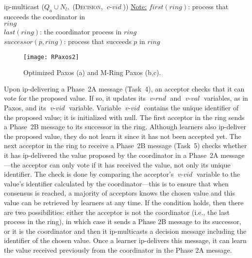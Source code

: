 \documentclass[final,3p,times,twocolumn,authoryear]{elsarticle}
\newcommand{\mv}[1]{\ensuremath{\operatorname{\mathit{#1}}}}
\begin{document}
\begin{algorithm}
\begin{distribalgo}[1]
		\ENDINDENT
			\STATE ip-multicast ($Q_a \cup N_l,$ (\textsc{Decision}, \mv{c-vid}))
		\ENDINDENT
	\ENDINDENT
\ENDINDENT
\vspace{5mm}
\underline{Note:} \hspace{2mm}$first(ring)$: process that succeeds the coordinator in\\
\hspace{9mm} $ring$\\
\hspace{10mm}$last(ring)$: the coordinator process in $ring$\\
\hspace{10mm}$successor(p, ring)$: process that succeeds $p$ in $ring$
\label{alg:rpaxos}
\end{distribalgo}


\end{algorithm}
 
\begin{figure*}[hbt]
\texttt{[image: RPaxos2]}
	\vspace{-5mm}\caption{Optimized Paxos (a) and M-Ring Paxos (b,c).}
	\label{fig:archh1}
\end{figure*}

Upon ip-delivering a Phase~2A message (Task~4), an acceptor checks that it can vote for the proposed value. If so, it updates its \mv{v-rnd} and \mv{v-val} variables, as in Paxos, and its \mv{v-vid} variable. Variable \mv{v-vid} contains the unique identifier of the proposed value; it is initialized with null. The first acceptor in the ring sends a Phase~2B message to its successor in the ring. Although learners also ip-deliver the proposed value, they do not learn it since it has not been accepted yet. The next acceptor in the ring to receive a Phase~2B message (Task~5) checks whether it has ip-delivered the value proposed by the coordinator in a Phase~2A message---the acceptor can only vote if it has received the value, not only its unique identifier. The check is done by comparing the acceptor's \mv{v-vid} variable to the value's identifier calculated by the coordinator---this is to ensure that when consensus is reached, a majority of acceptors knows the chosen value and this value can be retrieved by learners at any time. If the condition holds, then there are two possibilities: either the acceptor is not the coordinator (i.e., the last process in the ring), in which case it sends a Phase 2B message to its successor, or it is the coordinator and then it ip-multicasts a decision message including the identifier of the chosen value. Once a learner ip-delivers this message, it can learn the value received previously from the coordinator in the Phase 2A message.
\end{document}
